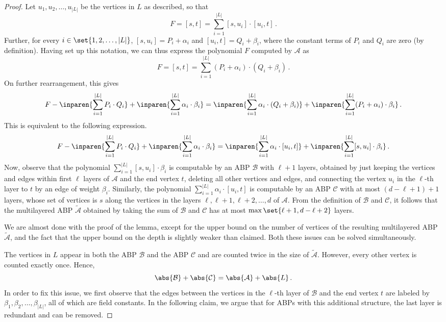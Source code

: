 \begin{proof}
	Let $u_1, u_2, \ldots, u_{|L|}$ be the vertices in $L$ as described, so that
	\[
		F = [s,t] = \sum_{i = 1}^{|L|} [s, u_{i}]\cdot [u_{i}, t] \, . 
	\]
	Further, for every $i \in \set{1, 2, \ldots, |L|}$, $[s,u_i] = P_i + \alpha_i$ and $[u_i,t] = Q_i + \beta_i$, where the constant terms of $P_i$ and $Q_i$ are zero (by definition). Having set up this notation, we can thus express the polynomial $F$ computed by $\mathcal{A}$ as 
	\[
		F = [s,t] = \sum_{i = 1}^{|L|} (P_i + \alpha_i)\cdot (Q_i + \beta_i) \, .
	\]
	On further rearrangement, this gives 
	\[
		F - \inparen{\sum_{i = 1}^{|L|} P_i \cdot Q_i} + \inparen{\sum_{i = 1}^{|L|} \alpha_i\cdot \beta_i} = \inparen{\sum_{i = 1}^{|L|} \alpha_i \cdot (Q_i + \beta_i)} + \inparen{\sum_{i = 1}^{|L|} (P_i + \alpha_i)\cdot \beta_i} \, .
	\] 
	This is equivalent to the following expression.
	\[
		F - \inparen{\sum_{i = 1}^{|L|} P_i \cdot Q_i} + \inparen{\sum_{i = 1}^{|L|} \alpha_i\cdot \beta_i} =  \inparen{\sum_{i = 1}^{|L|} \alpha_i\cdot [u_i, t]} + \inparen{\sum_{i = 1}^{|L|} [s, u_i]\cdot \beta_i} \, .
	\] 
	Now, observe that the polynomial $\sum_{i=1}^{|L|} [s, u_i] \cdot \beta_i$ is computable by an ABP $\mathcal{B}$ with $\ell+1$ layers, obtained by just keeping the vertices and edges within first $\ell$ layers of $\mathcal{A}$ and the end vertex $t$, deleting all other vertices and edges, and connecting the vertex $u_i$ in the $\ell$-th layer to $t$ by an edge of weight $\beta_i$.  
	Similarly, the polynomial $\sum_{i=1}^{|L|} \alpha_i\cdot [u_i, t]$ is computable by an ABP $\mathcal{C}$ with at most $(d-\ell + 1)+1$ layers,  whose set of vertices is $s$ along the vertices in the layers $\ell, \ell + 1, \ell+2, \ldots, d$ of $\mathcal {A}$. From the definition of $\mathcal{B}$ and $\mathcal{C}$, it follows that the multilayered ABP $\tilde{\mathcal{A}}$ obtained by taking the sum of $\mathcal{B}$ and $\mathcal{C}$ has at most $\max\set{\ell+1, d-\ell+2}$ layers. 
		
	We are almost done with the proof of the lemma, except for the upper bound on the number of vertices of the resulting multilayered ABP $\tilde{\mathcal{A}}$, and the fact that the upper bound on the depth is slightly weaker than claimed. Both these issues can be solved simultaneously.
	
	 The vertices in $L$ appear in both the ABP $\mathcal{B}$ and the ABP $\mathcal{C}$ and are counted twice in the size of $\tilde{\mathcal{A}}$. However, every other vertex is counted exactly once.  Hence, 
	\begin{equation}\label{eqn:overlap}
		\abs{\mathcal{B}} + \abs{\mathcal{C}} =  \abs{\mathcal{A}} + \abs{L} \, .
	\end{equation}
 	In order to fix this issue, we first observe that the edges between the vertices in the $\ell$-th layer of $\mathcal{B}$ and the end vertex $t$ are labeled by $\beta_{1}, \beta_2, \ldots, \beta_{|L|}$, all of which are field constants. In the following claim, we argue that for ABPs with this additional structure, the last layer is redundant and can be removed.


\end{proof}
